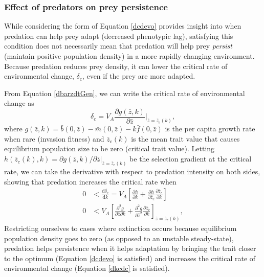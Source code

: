 \documentclass[11pt]{article}
\begin{document}
\subsubsection*{Effect of predators on prey persistence}

While considering the form of Equation \eqref{dcdevo} provides insight into when predation can help prey adapt (decreased phenotypic lag), satisfying this condition does not necessarily mean that predation will help prey \textit{persist} (maintain positive population density) in a more rapidly changing environment.  
Because predation reduces prey density, it can lower the critical rate of environmental change, $\delta_c$, even if the prey are more adapted.  

From Equation \eqref{dbarzdtGen}, we can write the critical rate of environmental change as
\begin{equation}
\delta_c = V_A \frac{\partial g(\bar{z},k)}{\partial \bar{z}}\Big|_{\bar{z}=\bar{z}_c(k)},
\end{equation}	
where $g(\bar{z},k) = \bar{b}(0,\bar{z})-\bar{m}(0,\bar{z})-k\bar{f}(0,\bar{z})$ is the per capita growth rate when rare (invasion fitness) and $\bar{z}_c(k)$ is the mean trait value that causes equilibrium population size to be zero (critical trait value).
Letting $h(\bar{z}_c(k),k) = \partial g(\bar{z},k) / \partial \bar{z}\big|_{\bar{z}=\bar{z}_c(k)}$ be the selection gradient at the critical rate, we can take the derivative with respect to predation intensity on both sides, showing that predation increases the critical rate when
\begin{equation}\label{dkcdc}
\begin{aligned}
0 &< \frac{\mathrm{d} \delta_c}{\mathrm{d} k} = V_A \left[ \frac{\partial h}{\partial k} + \frac{\partial h}{\partial \bar{z}_c} \frac{\partial \bar{z}_c}{\partial k} \right] \\
0 &< V_A \left[ \frac{\partial^2 g}{\partial \bar{z}\partial k } + \frac{\partial^2 g}{\partial \bar{z}^2} \frac{\partial \bar{z}_c}{\partial k} \right]_{\bar{z}=\bar{z}_c(k)} ,
\end{aligned}
\end{equation}	
Restricting ourselves to cases where extinction occurs because equilibrium population density goes to zero (as opposed to an unstable steady-state), predation helps persistence when it helps adaptation by bringing the trait closer to the optimum (Equation \ref{dcdevo} is satisfied) and increases the critical rate of environmental change (Equation \ref{dkcdc} is satisfied). 
\end{document}
